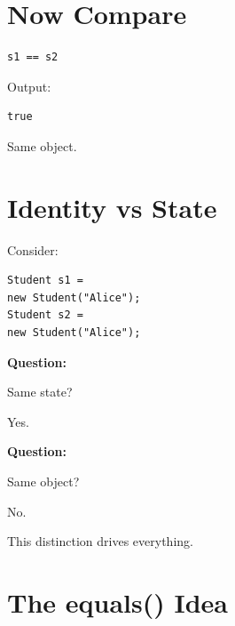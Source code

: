 \documentclass[11pt,a4paper]{book}
\begin{document}

\section{Now Compare}

\begin{verbatim} 
s1 == s2
\end{verbatim}


Output:

\begin{verbatim}
true
\end{verbatim}


Same object.


\section{Identity vs State}

Consider:

\begin{verbatim} 
Student s1 =
new Student("Alice");
Student s2 =
new Student("Alice");
\end{verbatim}


\textbf{Question:}

Same state?


Yes.


\textbf{Question:}

Same object?


No.


This distinction drives everything.


\section{The equals() Idea}
\end{document}

